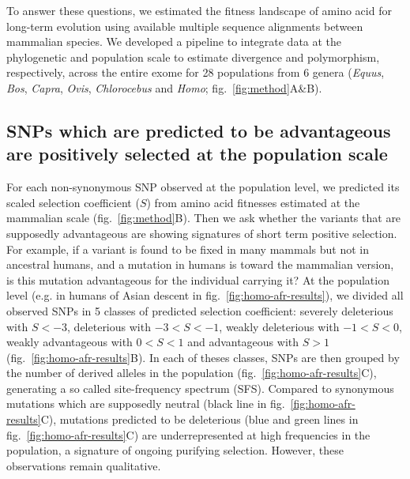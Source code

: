 \documentclass{article}
\newcommand{\Sphy}{S}
\newcommand{\divStrongDel}{\Sphy < -3}
\newcommand{\divDel}{-3 < \Sphy < -1}
\newcommand{\divWeakDel}{-1 < \Sphy < 0}
\newcommand{\divWeakAdv}{0 < \Sphy < 1}
\newcommand{\divAdv}{ \Sphy > 1}
\begin{document}
    To answer these questions, we estimated the fitness landscape of amino acid for long-term evolution using available multiple sequence alignments between mammalian species\cite{ranwez_orthomam_2007, howe_ensembl_2021}.
    We developed a pipeline to integrate data at the phylogenetic and population scale to estimate divergence and polymorphism, respectively, across the entire exome for 28 populations from 6 genera (\textit{Equus},  \textit{Bos}, \textit{Capra}, \textit{Ovis}, \textit{Chlorocebus} and \textit{Homo}; fig.~\ref{fig:method}A\&B).


    \subsection*{SNPs which are predicted to be advantageous are positively selected at the population scale}


    For each non-synonymous SNP observed at the population level, we predicted its scaled selection coefficient ($\Sphy$) from amino acid fitnesses estimated at the mammalian scale (fig.~\ref{fig:method}B).
    Then we ask whether the variants that are supposedly advantageous are showing signatures of short term positive selection.
    For example, if a variant is found to be fixed in many mammals but not in ancestral humans, and a mutation in humans is toward the mammalian version, is this mutation advantageous for the individual carrying it?
    At the population level (e.g. in humans of Asian descent in fig.~\ref{fig:homo-afr-results}), we divided all observed SNPs in 5 classes of predicted selection coefficient: severely deleterious with $\divStrongDel$, deleterious with $\divDel$, weakly deleterious with $\divWeakDel$, weakly advantageous with $\divWeakAdv$ and advantageous with $\divAdv$ (fig.~\ref{fig:homo-afr-results}B).
    In each of theses classes, SNPs are then grouped by the number of derived alleles in the population (fig.~\ref{fig:homo-afr-results}C), generating a so called site-frequency spectrum (SFS).
    Compared to synonymous mutations which are supposedly neutral (black line in fig.~\ref{fig:homo-afr-results}C), mutations predicted to be deleterious (blue and green lines in fig.~\ref{fig:homo-afr-results}C) are underrepresented at high frequencies in the population, a signature of ongoing purifying selection.
    However, these observations remain qualitative.
\end{document}
